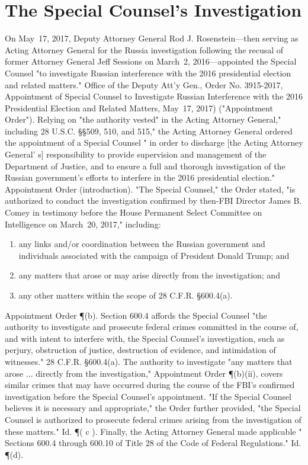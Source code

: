 \section{The Special Counsel's Investigation}

On May~17, 2017, Deputy Attorney General Rod J. Rosenstein---then serving as Acting Attorney General for the Russia investigation following the recusal of former Attorney General Jeff Sessions on March~2, 2016---appointed the Special Counsel "to investigate Russian interference with the 2016 presidential election and related matters."
Office of the Deputy Att'y Gen., Order No. 3915-2017, Appointment of Special Counsel to Investigate Russian Interference with the 2016 Presidential Election and Related Matters, May~17, 2017) ("Appointment Order").
Relying on "the authority vested" in the Acting Attorney General," including 28 U.S.C. \S\S 509, 510, and 515," the Acting Attorney General ordered the appointment of a Special Counsel " in order to discharge [the Acting Attorney General' s] responsibility to provide supervision and management of the Department of Justice, and to ensure a full and thorough investigation of the Russian government's efforts to interfere in the 2016 presidential election." Appointment Order (introduction).
"The Special Counsel," the Order stated, "is authorized to conduct the investigation confirmed by then-FBI Director James B. Comey in testimony before the House Permanent Select Committee on Intelligence on March~20, 2017," including:

\begin{enumerate}[i]
  \item any links and/or coordination between the Russian government and individuals associated with the campaign of President Donald Trump; and
  \item any matters that arose or may arise directly from the investigation; and
  \item any other matters within the scope of 28 C.F.R. \S 600.4(a).
\end{enumerate}

Appointment Order \P (b). Section 600.4 affords the Special Counsel "the authority to investigate and prosecute federal crimes committed in the course of, and with intent to interfere with, the Special Counsel's investigation, such as perjury, obstruction of justice, destruction of evidence, and intimidation of witnesses." 28 C.F.R. \S 600.4(a).
The authority to investigate "any matters that arose ... directly from the investigation," Appointment Order \P (b)(ii), covers similar crimes that may have occurred during the course of the FBI's confirmed investigation before the Special Counsel's appointment.
"If the Special Counsel believes it is necessary and appropriate," the Order further provided, "the Special Counsel is authorized to prosecute federal crimes arising from the investigation of these matters." Id. \P ( c ).
Finally, the Acting Attorney General made applicable " Sections 600.4 through 600.10 of Title 28 of the Code of Federal Regulations." Id. \P (d).

